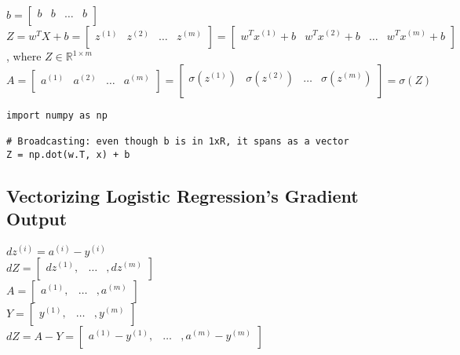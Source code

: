 \documentclass{article}
\begin{document}
$b =
\begin{bmatrix}
b & b & \dots & b\\
\end{bmatrix}
$\\

$Z =
w^T X +b =
\begin{bmatrix}
z^{(1)} & z^{(2)} & \dots & z^{(m)}\\
\end{bmatrix}
= \begin{bmatrix}
w^T x^{(1)} +b & w^T x^{(2)} +b & \dots & w^T x^{(m)} + b \\
\end{bmatrix}
$\\

, where $Z \in \mathbb{R}^{1 \times m}$\\

$A =
\begin{bmatrix}
a^{(1)} & a^{(2)} & \dots & a^{(m)}\\
\end{bmatrix}
=\begin{bmatrix}
\sigma(z^{(1)}) & \sigma(z^{(2)}) & \dots & \sigma(z^{(m)})\\
\end{bmatrix} = \sigma(Z)
$\\

\lstset{language=Python}
\begin{lstlisting}
import numpy as np

# Broadcasting: even though b is in 1xR, it spans as a vector
Z = np.dot(w.T, x) + b

\end{lstlisting}

\newpage
\subsection{Vectorizing Logistic Regression's Gradient Output}

$dz^{(i)} = a^{(i)}- y^{(i)}$\\
$dZ = \begin{bmatrix}
dz^{(1)}, & \dots & , dz^{(m)} \\
\end{bmatrix} $\\
$A = \begin{bmatrix}
a^{(1)}, & \dots & , a^{(m)} \\
\end{bmatrix} $\\
$Y = \begin{bmatrix}
y^{(1)}, & \dots & , y^{(m)} \\
\end{bmatrix} $\\
$dZ = A-Y =
\begin{bmatrix}
a^{(1)} - y^{(1)}, & \dots & , a^{(m)}-y^{(m)} \\
\end{bmatrix} $\\
\end{document}

